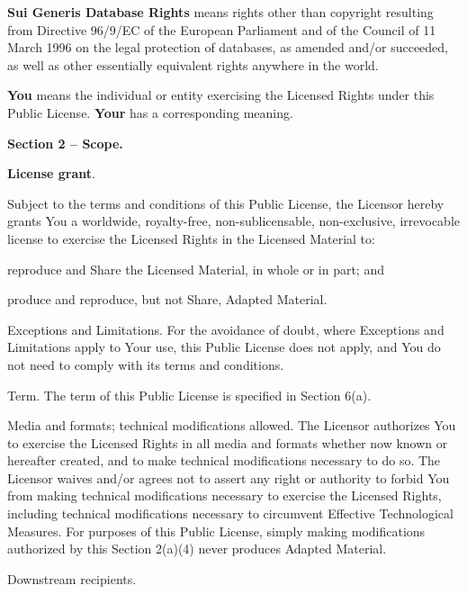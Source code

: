 \begin{doclicense@enumerate}
\item \textbf{Sui Generis Database Rights} means rights other than copyright resulting from Directive 96/9/EC of the European Parliament and of the Council of 11 March 1996 on the legal protection of databases, as amended and/or succeeded, as well as other essentially equivalent rights anywhere in the world.
\item \textbf{You} means the individual or entity exercising the Licensed Rights under this Public License. \textbf{Your} has a corresponding meaning.
\end{doclicense@enumerate}
\par \textbf{Section 2 – Scope.}
\begin{doclicense@enumerate}
\item \textbf{License grant}.
\begin{doclicense@enumerate}
\item Subject to the terms and conditions of this Public License, the Licensor hereby grants You a worldwide, royalty-free, non-sublicensable, non-exclusive, irrevocable license to exercise the Licensed Rights in the Licensed Material to:
\begin{doclicense@enumerate}
\item reproduce and Share the Licensed Material, in whole or in part; and
\item produce and reproduce, but not Share, Adapted Material.
\end{doclicense@enumerate}
\item Exceptions and Limitations. For the avoidance of doubt, where Exceptions and Limitations apply to Your use, this Public License does not apply, and You do not need to comply with its terms and conditions.
\item Term. The term of this Public License is specified in Section 6(a).
\item Media and formats; technical modifications allowed. The Licensor authorizes You to exercise the Licensed Rights in all media and formats whether now known or hereafter created, and to make technical modifications necessary to do so. The Licensor waives and/or agrees not to assert any right or authority to forbid You from making technical modifications necessary to exercise the Licensed Rights, including technical modifications necessary to circumvent Effective Technological Measures. For purposes of this Public License, simply making modifications authorized by this Section 2(a)(4) never produces Adapted Material.
\item Downstream recipients.


\end{doclicense@enumerate}
\end{doclicense@enumerate}
